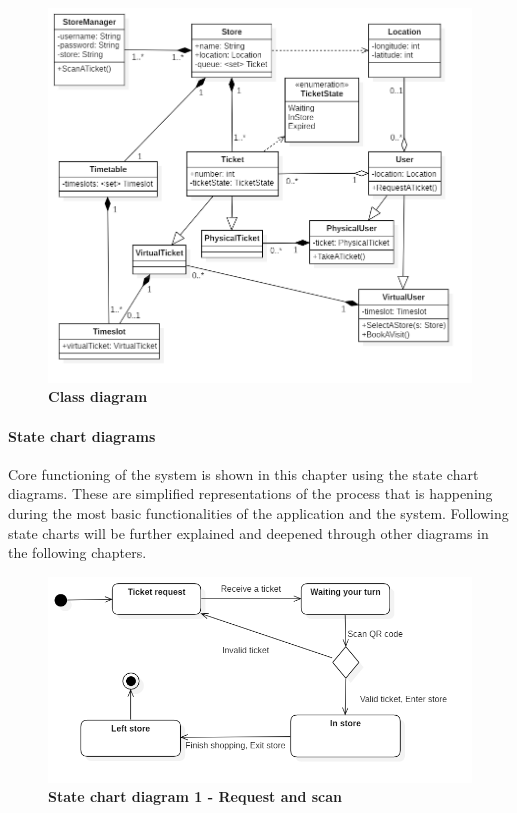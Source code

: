 \begin{figure}[!htb]
\centering
\includegraphics[width=\textwidth]{Images/ClassDiagramMain.png}
\caption{\label{fig:statechart1}\textbf{Class diagram}}
\end{figure}
\newpage
\newpage

\paragraph{State chart diagrams}\hfill \break

\hspace{\parindent}Core functioning of the system is shown in this chapter using the state chart diagrams. These are simplified representations of the process that is happening during the most basic functionalities of the application and the system. Following state charts will be further explained and deepened through other diagrams in the following chapters. 

\begin{figure}[!htb]
\centering
\includegraphics[width=\textwidth]{Images/StatechartDiagram1_RequestAndScan.png}
\caption{\label{fig:statechart1}\textbf{State chart diagram 1 - Request and scan}}
\end{figure}
\newpage


